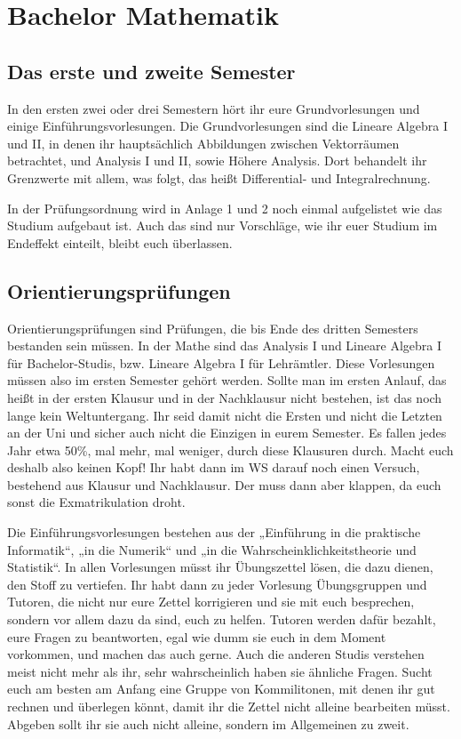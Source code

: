 \section{Bachelor Mathematik}


\subsection{Das erste und zweite Semester}

In den ersten zwei oder drei Semestern hört ihr eure Grundvorlesungen und
einige Einführungsvorlesungen. Die Grundvorlesungen sind die Lineare Algebra I
und II, in denen ihr hauptsächlich Abbildungen zwischen Vektorräumen
betrachtet, und Analysis I und II, sowie Höhere Analysis. Dort behandelt ihr
Grenzwerte mit allem, was folgt, das heißt Differential- und Integralrechnung.

In der Prüfungsordnung wird in Anlage 1 und 2 noch einmal aufgelistet wie das
Studium aufgebaut ist. Auch das sind nur Vorschläge, wie ihr euer Studium im
Endeffekt einteilt, bleibt euch überlassen.

\subsection{Orientierungsprüfungen}

Orientierungsprüfungen sind Prüfungen, die bis Ende des dritten Semesters
bestanden sein müssen. In der Mathe sind das Analysis I und Lineare Algebra I
für Bachelor-Studis, bzw. Lineare Algebra I für Lehrämtler.  Diese Vorlesungen
müssen also im ersten Semester gehört werden.  Sollte man im ersten Anlauf, das
heißt in der ersten Klausur und in der Nachklausur nicht bestehen, ist das noch
lange kein Weltuntergang. Ihr seid damit nicht die Ersten und nicht die Letzten
an der Uni und sicher auch nicht die Einzigen in eurem Semester.  Es fallen
jedes Jahr etwa 50\%, mal mehr, mal weniger, durch diese Klausuren durch. Macht
euch deshalb also keinen Kopf! Ihr habt dann im WS darauf noch einen Versuch,
bestehend aus Klausur und Nachklausur. Der muss dann aber klappen, da euch
sonst die Exmatrikulation droht.

Die Einführungsvorlesungen bestehen aus der „Einführung in die praktische
Informatik“, „in die Numerik“ und „in die Wahrscheinklichkeitstheorie und
Statistik“.  In allen Vorlesungen müsst ihr Übungszettel lösen, die dazu dienen,
den Stoff zu vertiefen.  Ihr habt dann zu jeder Vorlesung Übungsgruppen und
Tutoren, die nicht nur eure Zettel korrigieren und sie mit euch
besprechen, sondern vor allem dazu da sind, euch zu helfen.  Tutoren werden
dafür bezahlt, eure Fragen zu beantworten, egal wie dumm sie euch in dem Moment
vorkommen, und machen das auch gerne.  Auch die anderen Studis verstehen meist
nicht mehr als ihr, sehr wahrscheinlich haben sie ähnliche Fragen.  Sucht euch
am besten am Anfang eine Gruppe von Kommilitonen, mit denen ihr gut rechnen und
überlegen könnt, damit ihr die Zettel nicht alleine bearbeiten müsst.  Abgeben
sollt ihr sie auch nicht alleine, sondern im Allgemeinen zu zweit.


